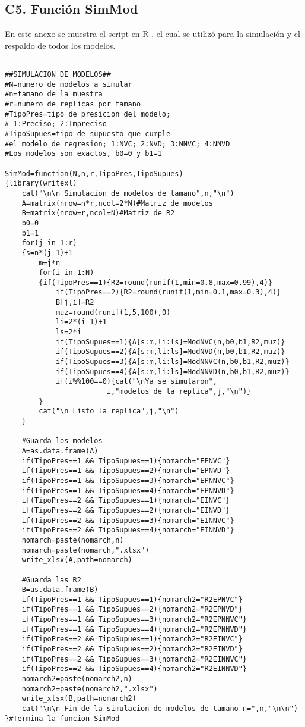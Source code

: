 \newpage
\subsection*{C5. Función SimMod}

En este anexo se muestra el script en R \parencite{R-2024}, el cual se utilizó para la simulación y el respaldo de todos los modelos.\\


\begin{verbatim}

##SIMULACION DE MODELOS##
#N=numero de modelos a simular
#n=tamano de la muestra
#r=numero de replicas por tamano
#TipoPres=tipo de presicion del modelo;
# 1:Preciso; 2:Impreciso
#TipoSupues=tipo de supuesto que cumple 
#el modelo de regresion; 1:NVC; 2:NVD; 3:NNVC; 4:NNVD
#Los modelos son exactos, b0=0 y b1=1

SimMod=function(N,n,r,TipoPres,TipoSupues)
{library(writexl)
	cat("\n\n Simulacion de modelos de tamano",n,"\n")
	A=matrix(nrow=n*r,ncol=2*N)#Matriz de modelos
	B=matrix(nrow=r,ncol=N)#Matriz de R2
	b0=0
	b1=1
	for(j in 1:r)
	{s=n*(j-1)+1
		m=j*n
		for(i in 1:N)
		{if(TipoPres==1){R2=round(runif(1,min=0.8,max=0.99),4)}
			if(TipoPres==2){R2=round(runif(1,min=0.1,max=0.3),4)}
			B[j,i]=R2
			muz=round(runif(1,5,100),0)
			li=2*(i-1)+1
			ls=2*i
			if(TipoSupues==1){A[s:m,li:ls]=ModNVC(n,b0,b1,R2,muz)}
			if(TipoSupues==2){A[s:m,li:ls]=ModNVD(n,b0,b1,R2,muz)}
			if(TipoSupues==3){A[s:m,li:ls]=ModNNVC(n,b0,b1,R2,muz)}
			if(TipoSupues==4){A[s:m,li:ls]=ModNNVD(n,b0,b1,R2,muz)}
			if(i%%100==0){cat("\nYa se simularon",
						i,"modelos de la replica",j,"\n")}
		}
		cat("\n Listo la replica",j,"\n")
	}
	
	#Guarda los modelos
	A=as.data.frame(A)
	if(TipoPres==1 && TipoSupues==1){nomarch="EPNVC"}
	if(TipoPres==1 && TipoSupues==2){nomarch="EPNVD"}
	if(TipoPres==1 && TipoSupues==3){nomarch="EPNNVC"}
	if(TipoPres==1 && TipoSupues==4){nomarch="EPNNVD"}
	if(TipoPres==2 && TipoSupues==1){nomarch="EINVC"}
	if(TipoPres==2 && TipoSupues==2){nomarch="EINVD"}
	if(TipoPres==2 && TipoSupues==3){nomarch="EINNVC"}
	if(TipoPres==2 && TipoSupues==4){nomarch="EINNVD"}
	nomarch=paste(nomarch,n)
	nomarch=paste(nomarch,".xlsx")
	write_xlsx(A,path=nomarch)
	
	#Guarda las R2
	B=as.data.frame(B)
	if(TipoPres==1 && TipoSupues==1){nomarch2="R2EPNVC"}
	if(TipoPres==1 && TipoSupues==2){nomarch2="R2EPNVD"}
	if(TipoPres==1 && TipoSupues==3){nomarch2="R2EPNNVC"}
	if(TipoPres==1 && TipoSupues==4){nomarch2="R2EPNNVD"}
	if(TipoPres==2 && TipoSupues==1){nomarch2="R2EINVC"}
	if(TipoPres==2 && TipoSupues==2){nomarch2="R2EINVD"}
	if(TipoPres==2 && TipoSupues==3){nomarch2="R2EINNVC"}
	if(TipoPres==2 && TipoSupues==4){nomarch2="R2EINNVD"}
	nomarch2=paste(nomarch2,n)
	nomarch2=paste(nomarch2,".xlsx")
	write_xlsx(B,path=nomarch2)
	cat("\n\n Fin de la simulacion de modelos de tamano n=",n,"\n\n")
}#Termina la funcion SimMod
\end{verbatim}



